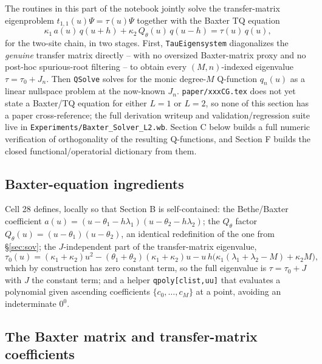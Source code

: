 \documentclass[11pt]{article}
\newcommand{\qth}{Q_\theta}
\begin{document}
The routines in this part of the notebook jointly solve the transfer-matrix eigenproblem
$t_{1,1}(u)\Psi=\tau(u)\Psi$ together with the Baxter TQ equation
\begin{equation}
  \kappa_1\,a(u)\,q(u+h) + \kappa_2\,\qth(u)\,q(u-h) = \tau(u)\,q(u),
  \label{eq:TQ}
\end{equation}
for the two-site chain, in two stages. First, \texttt{TauEigensystem} diagonalizes the
\emph{genuine} transfer matrix directly -- with no oversized Baxter-matrix proxy and no post-hoc
spurious-root filtering -- to obtain every $(M,n)$-indexed eigenvalue $\tau=\tau_0+J_n$. Then
\texttt{QSolve} solves for the monic degree-$M$ Q-function $q_n(u)$ as a linear nullspace problem at
the now-known $J_n$. \texttt{paper/xxxCG.tex} does not yet state a Baxter/TQ equation for either
$L=1$ or $L=2$, so none of this section has a paper cross-reference; the full derivation writeup
and validation/regression suite live in \texttt{Experiments/Baxter\_Solver\_L2.wb}. Section C below
builds a full numeric verification of orthogonality of the resulting Q-functions, and Section F
builds the closed functional/operatorial dictionary from them.

\subsection*{Baxter-equation ingredients}

Cell 28 defines, locally so that Section B is self-contained: the Bethe/Baxter coefficient
$a(u) = (u-\theta_1-h\lambda_1)(u-\theta_2-h\lambda_2)$; the $\qth$ factor
$\qth(u)=(u-\theta_1)(u-\theta_2)$, an identical redefinition of the one from \S\ref{sec:sov}; the
$J$-independent part of the transfer-matrix eigenvalue,
\[
  \tau_0(u) = (\kappa_1+\kappa_2)u^2 - (\theta_1+\theta_2)(\kappa_1+\kappa_2)u
    - u\,h\bigl(\kappa_1(\lambda_1+\lambda_2-M)+\kappa_2 M\bigr),
\]
which by construction has zero constant term, so the full eigenvalue is $\tau=\tau_0+J$ with $J$ the
constant term; and a helper \texttt{qpoly[clist,uu]} that evaluates a polynomial given ascending
coefficients $\{c_0,\dots,c_M\}$ at a point, avoiding an indeterminate $0^0$.

\subsection*{The Baxter matrix and transfer-matrix coefficients}
\end{document}
